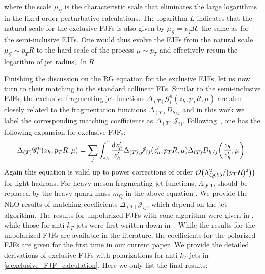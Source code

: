 \documentclass[a4paper, 11 pt]{article}
\begin{document}
where the scale $\mu_{\mathscr{G}}$ is the characteristic scale that eliminates the large logarithms in the fixed-order perturbative calculations. The logarithm $L$ indicates that the natural scale for the exclusive FJFs is also given by $\mu_{\mathscr{G}} = p_T R$, the same as for the semi-inclusive FJFs. One would thus evolve the FJFs from the natural scale $\mu_{\mathscr{G}}\sim p_T R$ to the hard scale of the process $\mu\sim p_T$ and effectively resum the logarithm of jet radius, $\ln R$. 

Finishing the discussion on the RG equation for the exclusive FJFs, let us now turn to their matching to the standard collinear FFs. Similar to the semi-inclusive FJFs, the exclusive fragmenting jet functions $\Delta_{(T)} \mathscr{G}_i^h(z_h, p_TR, \mu)$ are also closely related to the fragmentation functions $\Delta_{(T)} D_{h/j}$ and in this work we label the corresponding matching coefficients as $\Delta_{(T)} \mathscr{J}_{i j}$.
Following~\cite{Jain:2011xz,Waalewijn:2012sv,Chien:2015ctp,Kang:2019ahe}, one has the following expansion for exclusive FJFs:
\begin{align}
\Delta _{(T)} \mathscr{G}_i^h (z_h, p_TR, \mu)
 =
\sum _j \int _{z_h}^1 \frac{\dd{z'_h}}{z'_h} \Delta_{(T)} \mathscr{J}_{ij} (z'_h, p_TR, \mu) \Delta _{(T)} D_{h/j} \pqty{\frac{z_h}{z'_h}, \mu}
\, . \label{e.exclusive_collinear_FJF_factorization}
\end{align}
Again this equation is valid up to power corrections of order $\order{\Lambda _{\mathrm{QCD}}^2 / \pqty{p_TR)^2}}$ for light hadrons. For heavy meson fragmenting jet functions, $\Lambda_{\mathrm{QCD}}$ should be replaced by the heavy quark mass $m_Q$ in the above equation \cite{Chien:2015ctp, Baumgart:2014upa}. We provide the NLO results of matching coefficients $\Delta_{(T)}\mathscr{J}_{i j}$, which depend on the jet algorithm.
The results for unpolarized FJFs with cone algorithm were given in \cite{Procura:2011aq}, while those for anti-$k_T$ jets were first written down in~\cite{Waalewijn:2012sv}. While the results for the unpolarized FJFs are available in the literature, the coefficients for the polarized FJFs are given for the first time in our current paper. We provide the detailed derivations of exclusive FJFs with polarizations for anti-$k_T$ jets in \cref{s.exclusive_FJF_calculation}. Here we only list the final results:
\end{document}
